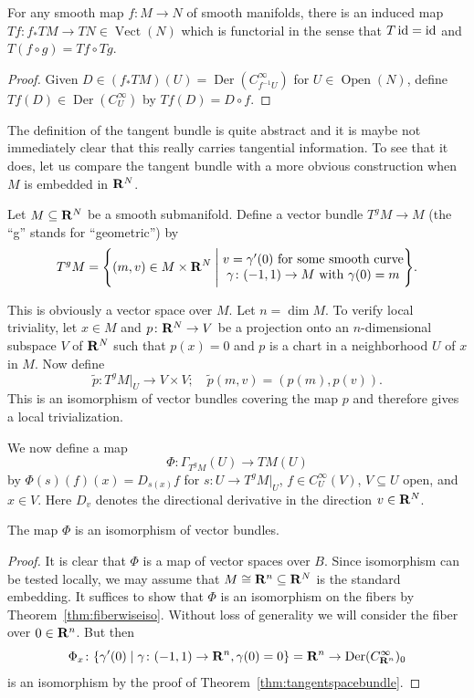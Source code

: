 \documentclass[a4paper,openany]{scrbook}
\DeclareMathOperator{\Vect}{Vect}
\DeclareMathOperator{\Open}{Open}
\DeclareMathOperator{\Der}{Der}
\begin{document}
\begin{thm}
For any smooth map $f\colon M \to N$ of smooth manifolds, there is an induced map $Tf\colon f_*TM \to TN \in \Vect(N)$ which is functorial in the sense that $T\operatorname{id}=\operatorname{id}$ and $T(f \circ g)=Tf \circ Tg$.
\end{thm}
\begin{proof}
Given $D \in (f_*TM)(U) = \Der(C^\infty_{f^{-1}U})$ for $U \in \Open(N)$, define $Tf(D) \in \Der(C^\infty_U)$ by $Tf(D) = D \circ f$.
\end{proof}

The definition of the tangent bundle is quite abstract and it is maybe not immediately clear that this really carries tangential information. To see that it does, let us compare the tangent bundle with a more obvious construction when $M$ is embedded in $\mathbf R^N$.

\begin{defn}
Let $M \subseteq \mathbf R^N$ be a smooth submanifold. Define a vector bundle $T^gM \to M$ (the ``g'' stands for ``geometric'') by
\[
T^gM = \Biggl\{(m,v) \in M \times \mathbf R^N \Biggm| \begin{matrix}v = \gamma'(0) \text{ for some smooth curve}\\\gamma\colon (-1,1) \to M \text{ with } \gamma(0)=m\end{matrix}\Biggr\}.
\]
\end{defn}
This is obviously a vector space over $M$. Let $n = \dim M$. To verify local triviality, let $x \in M$ and $p\colon \mathbf R^N \to V$ be a projection onto an $n$-dimensional subspace $V$ of $\mathbf R^N$ such that $p(x)=0$ and $p$ is a chart in a neighborhood $U$ of $x$ in $M$. Now define
\[
\tilde p\colon T^gM|_U \to V \times V; \quad \tilde p(m,v) = (p(m),p(v)).
\]
This is an isomorphism of vector bundles covering the map $p$ and therefore gives a local trivialization.

We now define a map
\[
\Phi\colon \Gamma_{T^gM}(U) \to TM(U)
\]
by $\Phi(s)(f)(x) = D_{s(x)}f$ for $s\colon U \to T^gM|_U$, $f \in C^\infty_U(V)$, $V \subseteq U$ open, and $x \in V$. Here $D_v$ denotes the directional derivative in the direction $v \in \mathbf R^N$.

\begin{prop}
The map $\Phi$ is an isomorphism of vector bundles.
\end{prop}
\begin{proof}
It is clear that $\Phi$ is a map of vector spaces over $B$. Since isomorphism can be tested locally, we may assume that $M \cong \mathbf R^n \subseteq \mathbf R^N$ is the standard embedding.
It suffices to show that $\Phi$ is an isomorphism on the fibers by Theorem~\ref{thm:fiberwiseiso}. Without loss of generality we will consider the fiber over $0 \in \mathbf R^n$. But then
\[
\Phi_x\colon \{ \gamma'(0) \mid \gamma\colon (-1,1) \to \R^n, \gamma(0)=0\} = \R^n \to \Der(C^\infty_{\R^n})_0
\]
is an isomorphism by the proof of Theorem~\ref{thm:tangentspacebundle}.
\end{proof}
\end{document}
